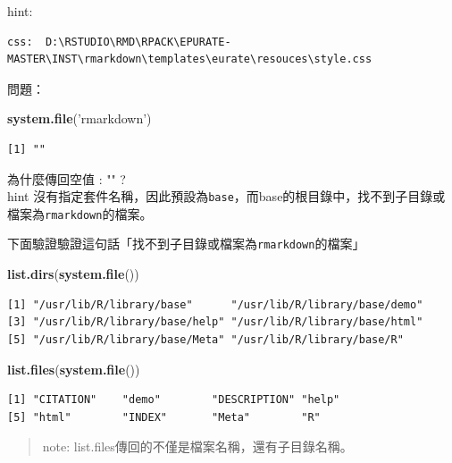 \documentclass[]{book}
\newenvironment{Shaded}{\begin{snugshade}}{\end{snugshade}}
\newcommand{\KeywordTok}[1]{\textcolor[rgb]{0.13,0.29,0.53}{\textbf{#1}}}
\newcommand{\NormalTok}[1]{#1}
\newcommand{\StringTok}[1]{\textcolor[rgb]{0.31,0.60,0.02}{#1}}
\theoremstyle{definition}
\theoremstyle{definition}
\theoremstyle{definition}
\theoremstyle{remark}
\begin{document}
hint:

\begin{verbatim}
css:  D:\RSTUDIO\RMD\RPACK\EPURATE-MASTER\INST\rmarkdown\templates\eurate\resouces\style.css
\end{verbatim}

問題：

\begin{Shaded}
\begin{Highlighting}[]
\KeywordTok{system.file}\NormalTok{(}\StringTok{'rmarkdown'}\NormalTok{)}
\end{Highlighting}
\end{Shaded}

\begin{verbatim}
[1] ""
\end{verbatim}

為什麼傳回空值 : "" ?\\
hint
沒有指定套件名稱，因此預設為\texttt{base}，而base的根目錄中，找不到子目錄或檔案為\texttt{rmarkdown}的檔案。

下面驗證驗證這句話「找不到子目錄或檔案為\texttt{rmarkdown}的檔案」

\begin{Shaded}
\begin{Highlighting}[]
\KeywordTok{list.dirs}\NormalTok{(}\KeywordTok{system.file}\NormalTok{())}
\end{Highlighting}
\end{Shaded}

\begin{verbatim}
[1] "/usr/lib/R/library/base"      "/usr/lib/R/library/base/demo"
[3] "/usr/lib/R/library/base/help" "/usr/lib/R/library/base/html"
[5] "/usr/lib/R/library/base/Meta" "/usr/lib/R/library/base/R"   
\end{verbatim}

\begin{Shaded}
\begin{Highlighting}[]
\KeywordTok{list.files}\NormalTok{(}\KeywordTok{system.file}\NormalTok{())}
\end{Highlighting}
\end{Shaded}

\begin{verbatim}
[1] "CITATION"    "demo"        "DESCRIPTION" "help"       
[5] "html"        "INDEX"       "Meta"        "R"          
\end{verbatim}

\begin{quote}
note: list.files傳回的不僅是檔案名稱，還有子目錄名稱。
\end{quote}
\end{document}
